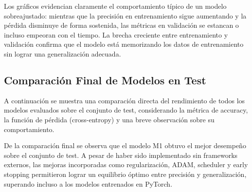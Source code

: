 \documentclass[11pt]{article}
\begin{document}
Los gráficos evidencian claramente el comportamiento típico de un modelo sobreajustado: mientras que la precisión en entrenamiento sigue aumentando y la pérdida disminuye de forma sostenida, las métricas en validación se estancan o incluso empeoran con el tiempo. La brecha creciente entre entrenamiento y validación confirma que el modelo está memorizando los datos de entrenamiento sin lograr una generalización adecuada.

\subsection*{Comparación Final de Modelos en Test}

A continuación se muestra una comparación directa del rendimiento de todos los modelos evaluados sobre el conjunto de test, considerando la métrica de accuracy, la función de pérdida (cross-entropy) y una breve observación sobre su comportamiento.

\begin{table}[H]
    \centering
    \caption{Comparación de métricas en test para todos los modelos evaluados.}
    \label{tab:test_comparison_models}
\end{table}

De la comparación final se observa que el modelo M1 obtuvo el mejor desempeño sobre el conjunto de test. A pesar de haber sido implementado sin frameworks externos, las mejoras incorporadas como regularización, ADAM, scheduler y early stopping permitieron lograr un equilibrio óptimo entre precisión y generalización, superando incluso a los modelos entrenados en PyTorch.
\end{document}
